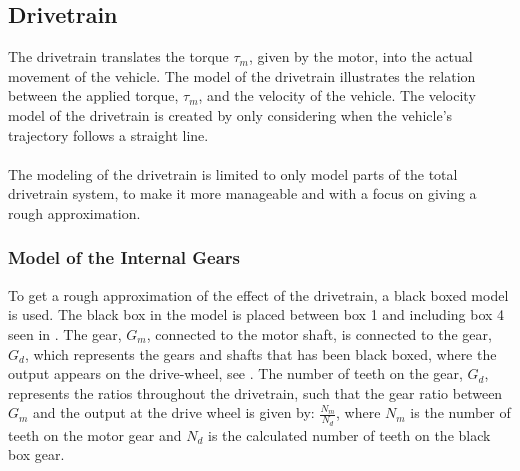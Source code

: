 \subsection{Drivetrain}\label{Drivetrain}

The drivetrain translates the torque $\tau_m$, given by the motor, into the actual movement of the vehicle. The model of the drivetrain illustrates the relation between the applied torque, $\tau_m$, and the velocity of the vehicle. The velocity model of the drivetrain is created by only considering when the vehicle's trajectory follows a straight line.\\\\
%
The modeling of the drivetrain is limited to only model parts of the total drivetrain system, to make it more manageable and with a focus on giving a rough approximation.
\subsubsection{Model of the Internal Gears}\label{BlackBoxModel}
To get a rough approximation of the effect of the drivetrain, a black boxed model is used. The black box in the model is placed between box 1 and including box 4 seen in  . The gear, $G_m$, connected to the motor shaft, is connected to the gear, $G_d$, which represents the gears and shafts that has been black boxed, where the output appears on the drive-wheel, see . The number of teeth on the gear, $G_d$, represents the ratios throughout the drivetrain, such that the gear ratio between $G_m$ and the output at the drive wheel is given by: $\frac{N_m}{N_d}$, where $N_m$ is the number of teeth on the motor gear and $N_d$ is the calculated number of teeth on the black box gear.

